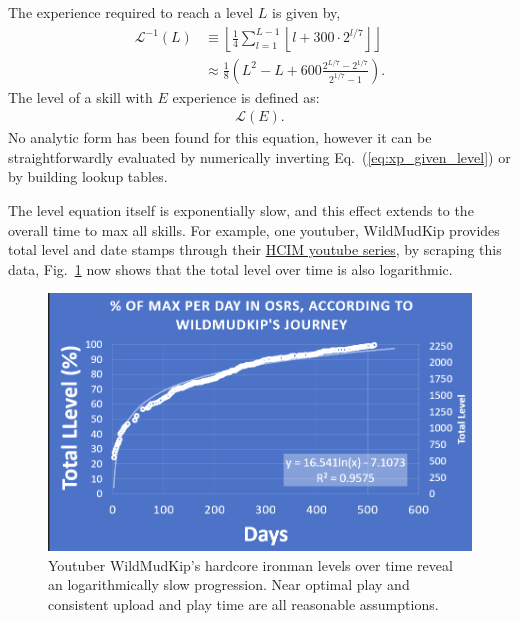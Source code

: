The experience required to reach a level $L$ is given by,
\begin{align}\label{eq:xp_given_level}
	\mathcal{L}^{-1}(L) &\equiv \left \lfloor \frac{1}{4} \sum_{l=1}^{L-1} \left \lfloor l + 300\cdot2^{l/7} \right \rfloor \right\rfloor\\
	&\approx \frac{1}{8}\left( L^2 - L + 600\frac{2^{L/7} - 2^{1/7}}{2^{1/7}-1}\right).
\end{align}
The level of a skill with $E$ experience is defined as:
\begin{align}\label{eq:level_given_xp}
	\mathcal{L}(E).
\end{align}
No analytic form has been found for this equation, however it can be straightforwardly evaluated by numerically inverting Eq.~(\ref{eq:xp_given_level}) or by building lookup tables.

The level equation itself is exponentially slow, and this effect extends to the overall time to max all skills. For example, one youtuber, WildMudKip provides total level and date stamps through their \href{https://www.youtube.com/watch?v=MiTp-06zJHk&list=PL4Ct8chrkvPgti4HYTZFo7FSfxlLlptbN&ab_channel=WildMudkip}{HCIM youtube series}, by scraping this data, Fig.~\ref{fig:maxing_time} now shows that the total level over time is also logarithmic.


\begin{figure}
	\centering
	\includegraphics[width=\linewidth]{img/general/wildmudkip_maxing.png}
	\caption{
		Youtuber WildMudKip's hardcore ironman levels over time reveal an logarithmically slow progression. Near optimal play and consistent upload and play time are all reasonable assumptions.
	}
	\label{fig:maxing_time}
\end{figure}
